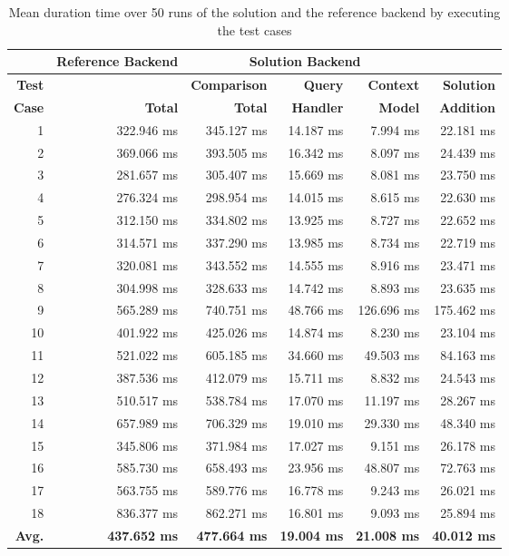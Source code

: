 \documentclass[draft,final]{vutinfth} %
\begin{document}
\begin{table}[]
	\caption{Mean duration time over 50 runs of the solution and the reference backend by executing the test cases}
	\centering
	\begin{tabular}{r|r|r|r|r|r}
		
		\textbf{} & \textbf{Reference Backend} & \multicolumn{3}{c|}{\textbf{Solution Backend}} &  \\ \hline \textbf{Test} & \textbf{} & \textbf{Comparison} & \textbf{Query} & \textbf{Context} & \textbf{Solution} \\ 
		\textbf{Case} & \textbf{Total} & \textbf{Total} & \textbf{Handler} & \textbf{Model} & \textbf{Addition} \\ \hline
		1 & 322.946 ms & 345.127 ms & 14.187 ms & 7.994 ms & 22.181 ms \\ 
		2 & 369.066 ms & 393.505 ms & 16.342 ms & 8.097 ms & 24.439 ms \\ 
		3 & 281.657 ms & 305.407 ms & 15.669 ms & 8.081 ms & 23.750 ms \\ 
		4 & 276.324 ms & 298.954 ms & 14.015 ms & 8.615 ms & 22.630 ms \\ 
		5 & 312.150 ms & 334.802 ms & 13.925 ms & 8.727 ms & 22.652 ms \\ 
		6 & 314.571 ms & 337.290 ms & 13.985 ms & 8.734 ms & 22.719 ms \\ 
		7 & 320.081 ms & 343.552 ms & 14.555 ms & 8.916 ms & 23.471 ms \\ 
		8 & 304.998 ms & 328.633 ms & 14.742 ms & 8.893 ms & 23.635 ms \\ 
		9 & 565.289 ms & 740.751 ms & 48.766 ms & 126.696 ms & 175.462 ms \\ 
		10 & 401.922 ms & 425.026 ms & 14.874 ms & 8.230 ms & 23.104 ms \\ 
		11 & 521.022 ms & 605.185 ms & 34.660 ms & 49.503 ms & 84.163 ms \\ 
		12 & 387.536 ms & 412.079 ms & 15.711 ms & 8.832 ms & 24.543 ms \\ 
		13 & 510.517 ms & 538.784 ms & 17.070 ms & 11.197 ms & 28.267 ms \\ 
		14 & 657.989 ms & 706.329 ms & 19.010 ms & 29.330 ms & 48.340 ms  \\ 
		15 & 345.806 ms & 371.984 ms & 17.027 ms & 9.151 ms & 26.178 ms \\ 
		16 & 585.730 ms & 658.493 ms & 23.956 ms & 48.807 ms & 72.763 ms \\ 
		17 & 563.755 ms & 589.776 ms & 16.778 ms & 9.243 ms & 26.021 ms \\ 
		18 & 836.377 ms & 862.271 ms & 16.801 ms & 9.093 ms & 25.894 ms \\ \hline
		\textbf{Avg.} & \textbf{437.652 ms} & \textbf{477.664 ms} & \textbf{19.004 ms} & \textbf{21.008 ms} & \textbf{40.012 ms} \\ 
	\end{tabular}
	\label{Tab:eva_performance}
\end{table}
\end{document}
